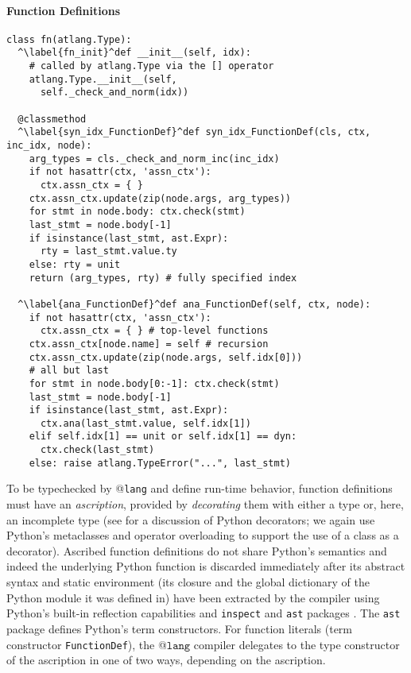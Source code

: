 \documentclass[9pt,preprint]{sigplanconf}
\newcommand{\lstinlinep}[1]{\lstinline[language=Python,basicstyle=\ttfamily\small]{#1}}
\begin{document}
\paragraph{Function Definitions}
\begin{codelisting}[t]
\begin{lstlisting}
class fn(atlang.Type):
  ^\label{fn_init}^def __init__(self, idx): 
    # called by atlang.Type via the [] operator 
    atlang.Type.__init__(self, 
      self._check_and_norm(idx))

  @classmethod
  ^\label{syn_idx_FunctionDef}^def syn_idx_FunctionDef(cls, ctx, inc_idx, node):
    arg_types = cls._check_and_norm_inc(inc_idx)
    if not hasattr(ctx, 'assn_ctx'): 
      ctx.assn_ctx = { }
    ctx.assn_ctx.update(zip(node.args, arg_types))
    for stmt in node.body: ctx.check(stmt)
    last_stmt = node.body[-1]
    if isinstance(last_stmt, ast.Expr): 
      rty = last_stmt.value.ty
    else: rty = unit
    return (arg_types, rty) # fully specified index

  ^\label{ana_FunctionDef}^def ana_FunctionDef(self, ctx, node):
    if not hasattr(ctx, 'assn_ctx'): 
      ctx.assn_ctx = { } # top-level functions
    ctx.assn_ctx[node.name] = self # recursion
    ctx.assn_ctx.update(zip(node.args, self.idx[0]))
    # all but last
    for stmt in node.body[0:-1]: ctx.check(stmt)
    last_stmt = node.body[-1]
    if isinstance(last_stmt, ast.Expr): 
      ctx.ana(last_stmt.value, self.idx[1])
    elif self.idx[1] == unit or self.idx[1] == dyn: 
      ctx.check(last_stmt)
    else: raise atlang.TypeError("...", last_stmt)
\end{lstlisting}
\caption{A portion of the type constructor \texttt{atlib.fn}.}
\label{fn-top}
\end{codelisting}
 To be typechecked by @\texttt{lang} and define run-time behavior, function definitions must have an \emph{ascription}, provided by \emph{decorating} them with either a type or, here, an incomplete type (see \cite{python} for a discussion of Python decorators; we again use Python's metaclasses and operator overloading to support the use of a class as a decorator). Ascribed function definitions do not share Python's semantics and indeed the underlying Python function is discarded immediately after its abstract syntax and static environment (its closure and the global dictionary of the Python module it was defined in) have been extracted by the compiler using Python's built-in reflection capabilities and \lstinlinep{inspect} and \lstinlinep{ast} packages \cite{python}. The \lstinlinep{ast} package defines Python's term constructors. For function literals (term constructor \lstinlinep{FunctionDef}), the @$\texttt{lang}$ compiler delegates to the type constructor of the ascription in one of two ways, depending on the ascription.
\end{document}
